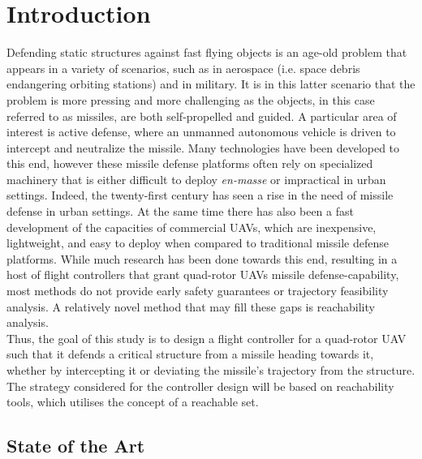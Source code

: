 
%

\chapter{Introduction}
\label{cha:intro}

Defending static structures against fast flying objects is an age-old problem that appears in a variety of scenarios, such as in aerospace (i.e. space debris endangering orbiting stations) and in military. It is in this latter scenario that the problem is more pressing and more challenging as the objects, in this case referred to as missiles, are both self-propelled and guided. A particular area of interest is active defense, where an unmanned autonomous vehicle is driven to intercept and neutralize the missile. Many technologies have been developed to this end, however these missile defense platforms often rely on specialized machinery that is either difficult to deploy \textit{en-masse} or impractical in urban settings. Indeed, the twenty-first century has seen a rise in the need of missile defense in urban settings. At the same time there has also been a fast development of the capacities of commercial UAVs, which are inexpensive, lightweight, and easy to deploy when compared to traditional missile defense platforms. While much research has been done towards this end, resulting in a host of flight controllers that grant quad-rotor UAVs missile defense-capability, most methods do not provide early safety guarantees or trajectory feasibility analysis. A relatively novel method that may fill these gaps is reachability analysis. \\

Thus, the goal of this study is to design a flight controller for a quad-rotor UAV such that it defends a critical structure from a missile heading towards it, whether by intercepting it or deviating the missile's trajectory from the structure. The strategy considered for the controller design will be based on reachability tools, which utilises the concept of a reachable set. \\

\section{State of the Art}
\label{sec:state_of_the_art}

